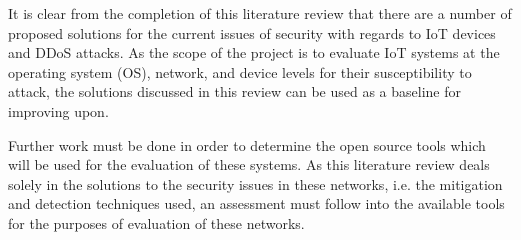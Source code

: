 It is clear from the completion of this literature review that there are a
number of proposed solutions for the current issues of security with regards to
IoT devices and DDoS attacks. As the scope of the project is to evaluate IoT
systems at the operating system (OS), network, and device levels for their
susceptibility to attack, the solutions discussed in this review can be used as
a baseline for improving upon.

Further work must be done in order to determine the open source tools which will
be used for the evaluation of these systems. As this literature review deals
solely in the solutions to the security issues in these networks, i.e. the
mitigation and detection techniques used, an assessment must follow into the
available tools for the purposes of evaluation of these networks.
